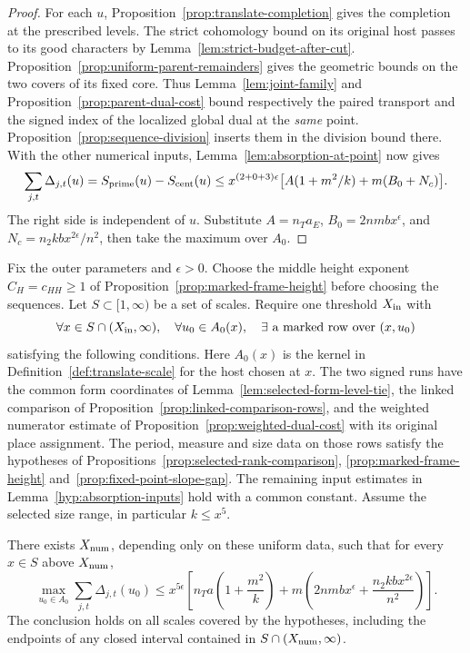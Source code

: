 \begin{proof}
For each \(u\), Proposition~\ref{prop:translate-completion} gives the
completion at the prescribed levels. The strict cohomology bound on its
original host passes to its good characters by Lemma~\ref{lem:strict-budget-after-cut}.
Proposition~\ref{prop:uniform-parent-remainders} gives the geometric bounds
on the two covers of its fixed core. Thus Lemma~\ref{lem:joint-family} and Proposition~\ref{prop:parent-dual-cost} bound respectively the paired transport and the signed index of the localized global dual at the \emph{same} point. Proposition~\ref{prop:sequence-division} inserts them in the division bound there. With the other numerical inputs, Lemma~\ref{lem:absorption-at-point} now gives
\[
 \sum_{j,t}\Delta_{j,t}(u)
 =S_{\rm prime}(u)-S_{\rm cent}(u)
 \le x^{(2+0+3)\epsilon}\bigl[A(1+m^2/k)+m(B_0+N_c)\bigr].
\]
The right side is independent of \(u\). Substitute \(A=n_Ta_E\), \(B_0=2nmbx^\epsilon\), and \(N_c=n_2kbx^{2\epsilon}/n^2\), then take the maximum over \(A_0\).
\end{proof}

\begin{auxlemma}
\label{lem:uniform-numerical-application}
Fix the outer parameters and \(\epsilon>0\). Choose the middle height
exponent \(C_H=c_{HH}\ge1\) of Proposition~\ref{prop:marked-frame-height}
before choosing the sequences. Let \(S\subset[1,\infty)\) be a set of scales.
Require one threshold \(X_{\rm in}\) with
\[
 \forall x\in S\cap(X_{\rm in},\infty),\quad
 \forall u_0\in A_0(x),\quad
 \exists\ \text{a marked row over }(x,u_0)
\]
satisfying the following conditions. Here \(A_0(x)\) is the kernel in
Definition~\ref{def:translate-scale} for the host chosen at \(x\).
The two signed runs have the common form coordinates of
Lemma~\ref{lem:selected-form-level-tie}, the linked comparison of
Proposition~\ref{prop:linked-comparison-rows}, and the weighted numerator
estimate of Proposition~\ref{prop:weighted-dual-cost} with its original
place assignment. The period, measure and size data on those rows satisfy
the hypotheses of Propositions~\ref{prop:selected-rank-comparison}, \ref{prop:marked-frame-height} and~\ref{prop:fixed-point-slope-gap}. The remaining input estimates in
Lemma~\ref{hyp:absorption-inputs} hold with a common constant.
Assume the selected size range, in particular \(k\le x^5\).

There exists \(X_{\rm num}\), depending only on these uniform data, such
that for every \(x\in S\) above \(X_{\rm num}\),
\[
   \max_{u_0\in A_0}\sum_{j,t}\Delta_{j,t}(u_0)
     \le x^{5\epsilon}
       \left[n_Ta\left(1+\frac{m^2}{k}\right)
             +m\left(2nmbx^\epsilon+
                     \frac{n_2kb x^{2\epsilon}}{n^2}\right)\right].
\]
The conclusion holds on all scales covered by the hypotheses,
including the endpoints of any closed interval contained in
\(S\cap(X_{\rm num},\infty)\).
\end{auxlemma}

